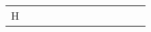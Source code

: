 \documentclass[runningheads]{llncs}
\begin{document}
\begin{table}[!ht]
\begin{tabular}{|p{7em}|p{2.5em}|p{2.5em}|p{3em}|p{2.5em}|p{3em}|p{2.5em}|p{3em}|p{2.5em}|p{3em}|p{2.5em}|p{3em}|}
 H
\end{tabular}
\end{table}
\end{document}
